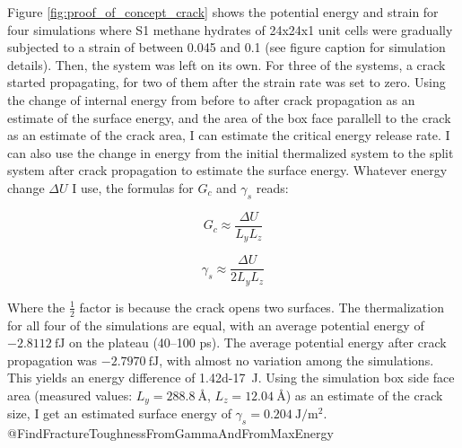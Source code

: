 Figure \ref{fig:proof_of_concept_crack} shows the potential energy and strain for four simulations where S1 methane hydrates of 24x24x1 unit cells were gradually subjected to a strain of between 0.045 and 0.1 (see figure caption for simulation details). Then, the system was left on its own. For three of the systems, a crack started propagating, for two of them after the strain rate was set to zero. Using the change of internal energy from before to after crack propagation as an estimate of the surface energy, and the area of the box face parallell to the crack as an estimate of the crack area, I can estimate the critical energy release rate. I can also use the change in energy from the initial thermalized system to the split system after crack propagation to estimate the surface energy. Whatever energy change $\Delta U$ I use, the formulas for $G_c$ and $\gamma_s$ reads:

\begin{equation}
	G_c \approx \frac{\Delta U}{L_yL_z}
\end{equation}

\begin{equation}
	\gamma_s \approx \frac{\Delta U}{2 L_y L_z}
\end{equation}

Where the $\frac{1}{2}$ factor is because the crack opens two surfaces. The thermalization for all four of the simulations are equal, with an average potential energy of $\SI{-2.8112}{\femto\joule}$ on the plateau (40--100 \si{\pico\second}). The average potential energy after crack propagation was $\SI{-2.7970}{\femto\joule}$, with almost no variation among the simulations. This yields an energy difference of \SI{1.42d-17}{\joule}. Using the simulation box side face area (measured values: $L_y = \SI{288.8}{\angstrom}$, $L_z = \SI{12.04}{\angstrom}$) as an estimate of the crack size, I get an estimated surface energy of $\gamma_s = \SI{0.204}{\joule\per\meter\squared}.$
@FindFractureToughnessFromGammaAndFromMaxEnergy

